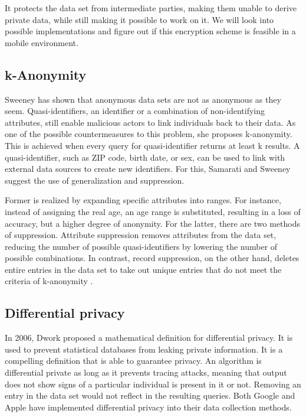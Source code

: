 It protects the data set from intermediate parties, making them unable to derive private data, while still making it possible to work on it. We will look into possible implementations and figure out if this encryption scheme is feasible in a mobile environment.

\subsection{k-Anonymity}
Sweeney \cite{DBLP:journals/ijufks/Sweene02} has shown that anonymous data sets are not as anonymous as they seem. Quasi-identifiers, an identifier or a combination of non-identifying attributes, still enable malicious actors to link individuals back to their data. As one of the possible countermeasures to this problem, she proposes k-anonymity. This is achieved when every query for quasi-identifier returns at least k results. A quasi-identifier, such as ZIP code, birth date, or sex, can be used to link with external data sources to create new identifiers. For this, Samarati \cite{samarati} and Sweeney \cite{DBLP:journals/ijufks/Sweene02} suggest the use of generalization and suppression.

Former is realized by expanding specific attributes into ranges. For instance, instead of assigning the real age, an age range is substituted, resulting in a loss of accuracy, but a higher degree of anonymity. For the latter, there are two methods of suppression. Attribute suppression removes attributes from the data set, reducing the number of possible quasi-identifiers by lowering the number of possible combinations. In contrast, record suppression, on the other hand, deletes entire entries in the data set to take out unique entries that do not meet the criteria of k-anonymity \cite{singapore}.

\subsection{Differential privacy}
In 2006, Dwork \cite{DBLP:conf/icalp/Dwork06} proposed a mathematical definition for differential privacy. It is used to prevent statistical databases from leaking private information. It is a compelling definition that is able to guarantee privacy. An algorithm is differential private as long as it prevents tracing attacks, meaning that output does not show signs of a particular individual is present in it or not. Removing an entry in the data set would not reflect in the resulting queries.
Both Google \cite{erlingsson_2014} and Apple \cite{apple} have implemented differential privacy into their data collection methods.

